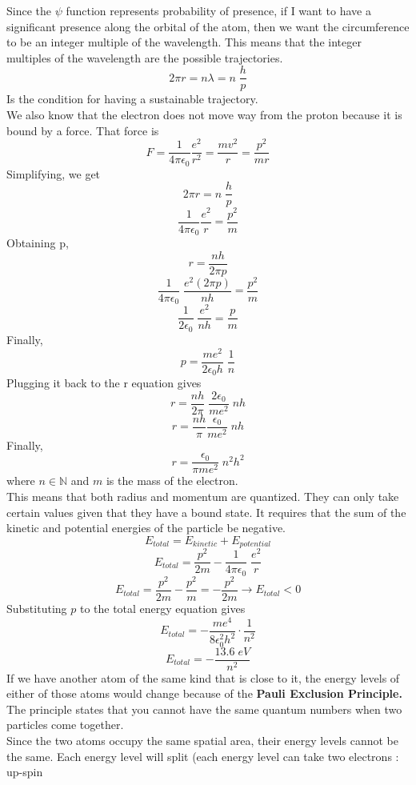 \documentclass{article}
\begin{document}
\vspace{8pt}
\noindent 
Since the $\psi$ function represents probability of presence, if I want to have a 
significant presence along the orbital of the atom, then we want the circumference 
to be an integer multiple of the wavelength. This means that the integer 
multiples of the wavelength are the possible trajectories. 
$$2\pi r = n\lambda = n \; \frac{h}{p}$$
Is the condition for having a sustainable trajectory. 
\vspace{8pt}
\\ We also know that the electron does not move way from the proton because it is 
bound by a force. That force is $$F = \frac{1}{4\pi\epsilon_{0}} \frac{e^2}{r^2}
= \frac{mv^2}{r} = \frac{p^2}{mr}$$
\newpage 
\noindent 
Simplifying, we get $$2\pi r = n \; \frac{h}{p}$$
$$\frac{1}{4\pi \epsilon_0} \frac{e^2}{r} = \frac{p^2}{m}$$
Obtaining p, $$r = \frac{nh}{2\pi p}$$
$$\frac{1}{4\pi\epsilon_0} \; \frac{e^2 (2\pi p)}{nh} = \frac{p^2}{m} $$
$$\frac{1}{2\epsilon_0} \; \frac{e^2}{nh} = \frac{p}{m}$$
Finally, 
$$\boxed{p = \frac{me^2}{2\epsilon_0 h} \; \frac{1}{n}}$$
Plugging it back to the r equation gives 
$$r = \frac{nh}{2\pi} \; \frac{2\epsilon_0}{me^2} \; nh$$
$$r=  \frac{nh}{\pi} \frac{\epsilon_0}{me^2} \; nh$$
Finally, 
$$\boxed{r = \frac{\epsilon_0}{\pi me^2} \; n^2 h^2}$$
where $n \in \mathbb{N}$ and $m$ is the mass of the electron. 
\vspace{8pt}
\\ This means that both radius and momentum are quantized. They can only take certain 
values given that they have a bound state. It requires that the sum of the kinetic and 
potential energies of the particle be negative. 
$$E_{total} = E_{kinetic} + E_{potential}$$
$$E_{total} = \frac{p^2}{2m} - \frac{1}{4\pi\epsilon_0} \; \frac{e^2}{r} $$ 
$$E_{total} = \frac{p^2}{2m} - \frac{p^2}{m} = -\frac{p^2}{2m} \rightarrow E_{total} < 0$$
Substituting $p$ to the total energy equation gives 
$$E_{total} = -\frac{m e^4}{8\epsilon_0^2 h^2} \cdot \frac{1}{n^2}$$ 
$$\boxed{E_{total} = -\frac{13.6\; eV}{n^2}}$$ 
If we have another atom of the same kind that is close to it, the energy levels of either
of those atoms would change because of the \textbf{Pauli Exclusion Principle.} The 
principle states that you cannot have the same quantum numbers when two particles come
together. 
\vspace{8pt}
\\ Since the two atoms occupy the same spatial area, their energy levels cannot be the 
same. Each energy level will split (each energy level can take two electrons : up-spin
\end{document}

